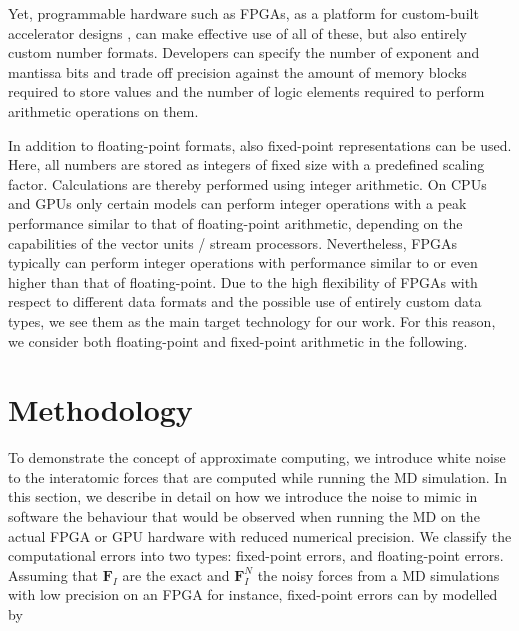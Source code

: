 \documentclass[format=acmsmall,authorversion,nonacm,timestamp,urlbreakonhyphens]{acmart}
\begin{document}
Yet, programmable hardware such as FPGAs, as a platform for custom-built accelerator designs \cite{Strzodka2006, KenterVector, KenterPragma}, can make effective use of all of these, but also entirely custom number formats.
Developers can specify the number of exponent and mantissa bits and trade off precision against the amount of memory blocks required to store values and the number of logic elements required to perform arithmetic operations on them.

In addition to floating-point formats, also fixed-point representations can be used. Here, all numbers are stored as integers of fixed size with a
predefined scaling factor. Calculations are thereby performed using integer arithmetic. On CPUs and GPUs only certain models can perform integer operations with a peak performance similar to that of floating-point arithmetic, depending on the capabilities of the vector units / stream processors. Nevertheless, FPGAs typically can perform integer operations with performance similar to or even higher than that of floating-point. Due to the high flexibility of FPGAs with respect to different data formats and the possible use of entirely custom data types, we see them as the main target technology for our work. For this reason, we consider both floating-point and fixed-point arithmetic in the following.

\section{Methodology}
\label{sec:methodology}
To demonstrate the concept of approximate computing, we introduce white noise to the interatomic forces that are computed while running the MD simulation. In this section, we describe in detail on how we introduce the noise to mimic in software the behaviour that would be observed when running the MD on the actual FPGA or GPU hardware with reduced numerical precision. We classify the computational errors into two types: fixed-point errors, and floating-point errors. Assuming that $\textbf{F}_{I}$ are the exact and $\textbf{F}_{I}^{N}$ the noisy forces from a MD simulations with low precision on an FPGA for instance, fixed-point errors can by modelled by
\end{document}
